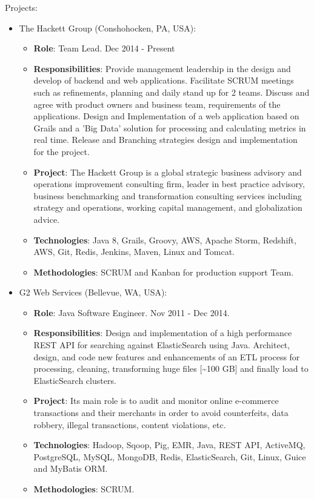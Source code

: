 \documentclass[11pt,a4paper,sans]{moderncv}        %
\begin{document}
  {
    Projects:\\
    \begin{itemize}
      \item The Hackett Group (Conshohocken, PA, USA):
        \begin{itemize}
          \item \textbf{Role}: Team Lead. Dec 2014 - Present
          \item \textbf{Responsibilities}: Provide management leadership in the design and develop of backend and web applications. Facilitate SCRUM meetings such as refinements, planning and daily stand up for 2 teams.
		Discuss and agree with product owners and business team, requirements of the applications. Design and Implementation of a web application based on Grails and a 'Big Data' solution for processing and calculating metrics in real time.
		Release and Branching strategies design and implementation for the project.
          \item \textbf{Project}: The Hackett Group is a global strategic business advisory and operations improvement consulting firm, leader in best practice advisory, business benchmarking and transformation consulting services including strategy and operations, working capital management, and globalization advice.
          \item \textbf{Technologies}: Java 8, Grails, Groovy, AWS, Apache Storm, Redshift, AWS, Git, Redis, Jenkins, Maven, Linux and Tomcat.
          \item \textbf{Methodologies}: SCRUM and Kanban for production support Team.
        \end{itemize}
      \item G2 Web Services (Bellevue, WA, USA):
        \begin{itemize}
          \item \textbf{Role}: Java Software Engineer. Nov 2011 - Dec 2014.
          \item \textbf{Responsibilities}: Design and implementation of a high performance REST API for searching against ElasticSearch using Java.
                Architect, design, and code new features and enhancements of an ETL process for processing, cleaning, transforming huge files [\textasciitilde{}100 GB] and finally load to ElasticSearch clusters. 
          \item \textbf{Project}: Its main role is to audit and monitor online e-commerce transactions and their merchants in order to avoid counterfeits, data robbery, illegal transactions, content violations, etc.
          \item \textbf{Technologies}: Hadoop, Sqoop, Pig, EMR, Java, REST API, ActiveMQ, PostgreSQL, MySQL, MongoDB, Redis, ElasticSearch, Git, Linux, Guice and MyBatis ORM.
          \item \textbf{Methodologies}: SCRUM.
        \end{itemize}
    \end{itemize}
  }
\end{document}
